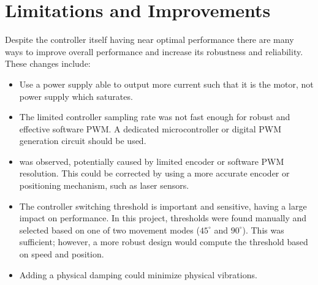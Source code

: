 \section{Limitations and Improvements}

Despite the controller itself having near optimal performance there are many ways to improve overall performance and increase its robustness and reliability.
These changes include:

\begin{itemize}

\item Use a power supply able to output more current such that it is the motor, not power supply which saturates.

\item The limited controller sampling rate was not fast enough for robust and effective software PWM. A dedicated microcontroller or digital PWM generation circuit should be used. 

\item {} was observed, potentially caused by limited encoder or software PWM resolution. This could be corrected by using a more accurate encoder or positioning mechanism, such as laser sensors. 


\item The controller switching threshold is important and sensitive, having a large impact on  performance. 
In this project, thresholds were found manually and selected based on one of two movement modes ($45^\circ$ and $90^\circ$). 
This was sufficient; however, a more robust design would compute the threshold based on speed and position.  

\item Adding a physical damping could minimize physical vibrations.

\end{itemize}

